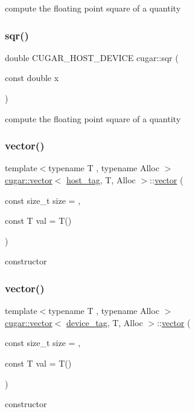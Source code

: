 compute the floating point square of a quantity \mbox{\label{group___basic_gaa8137b4ffa803b854990ff46df30ef63}} 
\subsubsection{\texorpdfstring{sqr()}{sqr()}\hspace{0.1cm}{\footnotesize\ttfamily [2/2]}}
{\footnotesize\ttfamily double C\+U\+G\+A\+R\+\_\+\+H\+O\+S\+T\+\_\+\+D\+E\+V\+I\+CE cugar\+::sqr (\begin{DoxyParamCaption}\item[{const double}]{x }\end{DoxyParamCaption})\hspace{0.3cm}{\ttfamily [inline]}}

compute the floating point square of a quantity \mbox{\label{group___basic_ga8407403c92ae9effc1472b1bf47bd3f6}} 
\subsubsection{\texorpdfstring{vector()}{vector()}\hspace{0.1cm}{\footnotesize\ttfamily [1/2]}}
{\footnotesize\ttfamily template$<$typename T , typename Alloc $>$ \\
\hyperlink{structcugar_1_1vector}{cugar\+::vector}$<$ \hyperlink{structcugar_1_1host__tag}{host\+\_\+tag}, T, Alloc $>$\+::\hyperlink{structcugar_1_1vector}{vector} (\begin{DoxyParamCaption}\item[{const size\+\_\+t}]{size = {},  }\item[{const T}]{val = {\ttfamily T()} }\end{DoxyParamCaption})\hspace{0.3cm}{\ttfamily [inline]}}

constructor \mbox{\label{group___basic_ga7954a5910e324f03b69b16b0fc0475fa}} 
\subsubsection{\texorpdfstring{vector()}{vector()}\hspace{0.1cm}{\footnotesize\ttfamily [2/2]}}
{\footnotesize\ttfamily template$<$typename T , typename Alloc $>$ \\
\hyperlink{structcugar_1_1vector}{cugar\+::vector}$<$ \hyperlink{structcugar_1_1device__tag}{device\+\_\+tag}, T, Alloc $>$\+::\hyperlink{structcugar_1_1vector}{vector} (\begin{DoxyParamCaption}\item[{const size\+\_\+t}]{size = {},  }\item[{const T}]{val = {\ttfamily T()} }\end{DoxyParamCaption})\hspace{0.3cm}{\ttfamily [inline]}}

constructor 